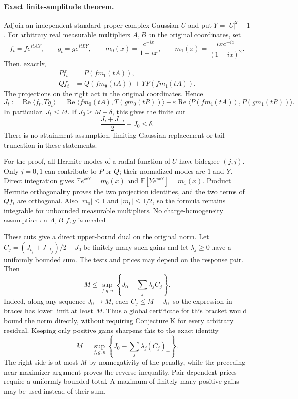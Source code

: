 \paragraph{Exact finite-amplitude theorem.}
Adjoin an independent standard proper complex Gaussian $U$ and put
$Y=|U|^2-1$. For arbitrary real measurable multipliers $A,B$ on the
original coordinates, set
\[
 f_t=f e^{itAY},\qquad g_t=g e^{itBY},\qquad
 m_0(x)=\frac{e^{-ix}}{1-ix},\qquad
 m_1(x)=\frac{ix e^{-ix}}{(1-ix)^2}.
\]
Then, exactly,
\begin{align*}
 Pf_t&=P(fm_0(tA)),\\
 Qf_t&=Q(fm_0(tA))+Y P(fm_1(tA)).
\end{align*}
The projections on the right act in the original coordinates. Hence
\begin{equation}\label{eq:fresh-exact-value}
 J_t:=\operatorname{Re}\langle f_t,Tg_t\rangle
 =\operatorname{Re}\langle fm_0(tA),T(gm_0(tB))\rangle
 -\varepsilon\operatorname{Re}\langle P(fm_1(tA)),P(gm_1(tB))\rangle.
\end{equation}
In particular, $J_t\le M$. If $J_0\ge M-\delta$, this gives the finite cut
\begin{equation}\label{eq:fresh-finite-cut}
 \frac{J_t+J_{-t}}2-J_0\le\delta.
\end{equation}
There is no attainment assumption, limiting Gaussian replacement or
tail truncation in these statements.

For the proof, all Hermite modes of a radial function of $U$ have
bidegree $(j,j)$. Only $j=0,1$ can contribute to $P$ or $Q$;
their normalized modes are $1$ and $Y$. Direct integration gives
$\mathbb E e^{ixY}=m_0(x)$ and
$\mathbb E[Y e^{ixY}]=m_1(x)$. Product Hermite orthogonality proves the
two projection identities, and the two terms of $Qf_t$ are orthogonal.
Also $|m_0|\le1$ and $|m_1|\le1/2$, so the formula remains integrable
for unbounded measurable multipliers. No charge-homogeneity assumption
on $A,B,f,g$ is needed.

These cuts give a direct upper-bound dual on the original norm.
Let $C_j=(J_{t_j}+J_{-t_j})/2-J_0$ be finitely many such gains and
let $\lambda_j\ge0$ have a uniformly bounded sum. The tests and prices
may depend on the response pair. Then
\[
 M\le\sup_{f,g,n}\left\{J_0-\sum_j\lambda_j C_j\right\}.
\]
Indeed, along any sequence $J_0\to M$, each $C_j\le M-J_0$,
so the expression in braces has lower limit at least $M$.
Thus a global certificate for this bracket would bound the norm
directly, without requiring Conjecture K for every arbitrary residual.
Keeping only positive gains sharpens this to the exact identity
\[
 \boxed{M=\sup_{f,g,n}\left\{J_0-
                     \sum_j\lambda_j(C_j)_+\right\}.}
\]
The right side is at most $M$ by nonnegativity of the penalty, while
the preceding near-maximizer argument proves the reverse inequality.
Pair-dependent prices require a uniformly bounded total. A maximum
of finitely many positive gains may be used instead of their sum.

